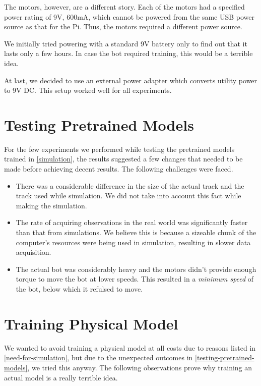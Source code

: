 \documentclass[12pt]{extreport}
\begin{document}
The motors, however, are a different story. Each of the motors had a specified power rating of 9V, 600mA, which cannot be powered from the same USB power source as that for the Pi. Thus, the motors required a different power source.

We initially tried powering with a standard 9V battery only to find out that it lasts only a few hours. In case the bot required training, this would be a terrible idea.

At last, we decided to use an external power adapter which converts utility power to 9V DC. This setup worked well for all experiments.

\section{Testing Pretrained Models} \label{testing-pretrained-models}
For the few experiments we performed while testing the pretrained models trained in \autoref{simulation}, the results suggested a few changes that needed to be made before achieving decent results. The following challenges were faced.

\begin{itemize}
 \item There was a considerable difference in the size of the actual track and the track used while simulation. We did not take into account this fact while making the simulation.
 \item The rate of acquiring observations in the real world was significantly faster than that from simulations. We believe this is because a sizeable chunk of the computer's resources were being used in simulation, resulting in slower data acquisition.
 \item The actual bot was considerably heavy and the motors didn't provide enough torque to move the bot at lower speeds. This resulted in a \emph{minimum speed} of the bot, below which it refulsed to move.
\end{itemize}

\section{Training Physical Model}

We wanted to avoid training a physical model at all costs due to reasons listed in \autoref{need-for-simulation}, but due to the unexpected outcomes in \autoref{testing-pretrained-models}, we tried this anyway. The following observations prove why training an actual model is a really terrible idea.
\end{document}
